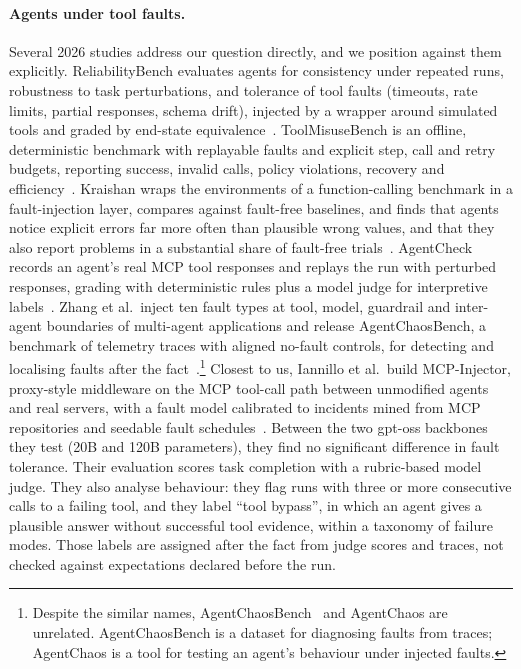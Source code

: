 \paragraph{Agents under tool faults.} Several 2026 studies address our question directly, and we position against them explicitly.
ReliabilityBench evaluates agents for consistency under repeated runs, robustness to task perturbations, and tolerance of tool faults (timeouts, rate limits, partial responses, schema drift), injected by a wrapper around simulated tools and graded by end-state equivalence~\cite{gupta2026reliabilitybench}.
ToolMisuseBench is an offline, deterministic benchmark with replayable faults and explicit step, call and retry budgets, reporting success, invalid calls, policy violations, recovery and efficiency~\cite{sigdel2026toolmisusebench}.
Kraishan wraps the environments of a function-calling benchmark in a fault-injection layer, compares against fault-free baselines, and finds that agents notice explicit errors far more often than plausible wrong values, and that they also report problems in a substantial share of fault-free trials~\cite{kraishan2026loud}.
AgentCheck records an agent's real MCP tool responses and replays the run with perturbed responses, grading with deterministic rules plus a model judge for interpretive labels~\cite{mazumder2026agentcheck}.
Zhang et al.\ inject ten fault types at tool, model, guardrail and inter-agent boundaries of multi-agent applications and release AgentChaosBench, a benchmark of telemetry traces with aligned no-fault controls, for detecting and localising faults after the fact~\cite{zhang2026agenticfail}.\footnote{Despite the similar names, AgentChaosBench~\cite{zhang2026agenticfail} and AgentChaos are unrelated. AgentChaosBench is a dataset for diagnosing faults from traces; AgentChaos is a tool for testing an agent's behaviour under injected faults.}
Closest to us, Iannillo et al.\ build MCP-Injector, proxy-style middleware on the MCP tool-call path between unmodified agents and real servers, with a fault model calibrated to incidents mined from MCP repositories and seedable fault schedules~\cite{iannillo2026mcpfaults}. Between the two gpt-oss backbones they test (20B and 120B parameters), they find no significant difference in fault tolerance. Their evaluation scores task completion with a rubric-based model judge. They also analyse behaviour: they flag runs with three or more consecutive calls to a failing tool, and they label ``tool bypass'', in which an agent gives a plausible answer without successful tool evidence, within a taxonomy of failure modes. Those labels are assigned after the fact from judge scores and traces, not checked against expectations declared before the run.


